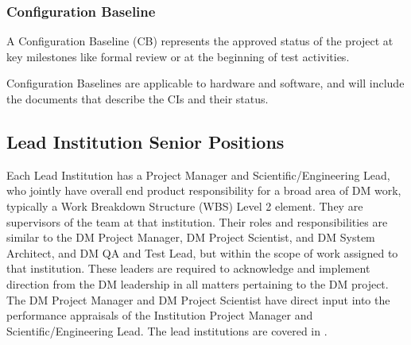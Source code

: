 \subsubsection{Configuration Baseline \label{sect:BSLdef}}
A Configuration Baseline (CB) represents the approved status of the project at key milestones like formal review 
or at the beginning of test activities.

Configuration Baselines are applicable to hardware and software, and will 
include the documents that describe the CIs and their status.


\subsection{Lead Institution Senior Positions}
Each Lead Institution has a Project Manager and Scientific/Engineering Lead, who jointly have overall end product responsibility for a broad area of DM work, typically a Work Breakdown Structure (WBS) Level 2 element. They are supervisors of the team at that institution.  Their roles and responsibilities are similar to the DM Project Manager, DM Project Scientist, and DM System Architect, and DM QA and Test Lead, but within the scope of work assigned to that institution.  These leaders are required to acknowledge and implement direction from the DM leadership in all matters pertaining to the DM project.  The DM Project Manager and DM Project Scientist have direct input into the performance appraisals of the Institution Project Manager and Scientific/Engineering Lead. 
The lead institutions are covered  in .

